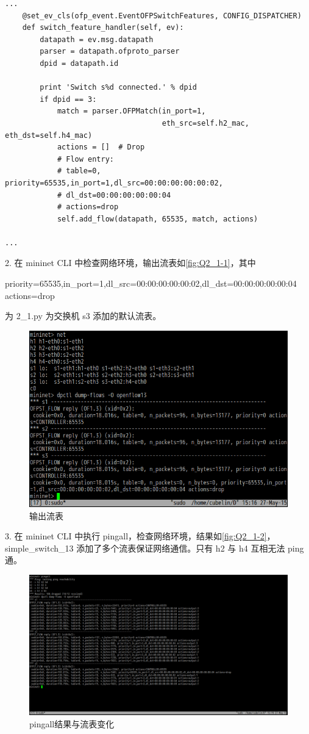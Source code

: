 \documentclass[format=draft,language=chinese,category=SDN]{hustreport}
\begin{document}
\begin{lstlisting}
...
    @set_ev_cls(ofp_event.EventOFPSwitchFeatures, CONFIG_DISPATCHER)
    def switch_feature_handler(self, ev):
        datapath = ev.msg.datapath
        parser = datapath.ofproto_parser
        dpid = datapath.id

        print 'Switch s%d connected.' % dpid
        if dpid == 3:
            match = parser.OFPMatch(in_port=1,
                                    eth_src=self.h2_mac, eth_dst=self.h4_mac)
            actions = []  # Drop
            # Flow entry:
            # table=0, priority=65535,in_port=1,dl_src=00:00:00:00:00:02,
            # dl_dst=00:00:00:00:00:04
            # actions=drop
            self.add_flow(datapath, 65535, match, actions)

...
\end{lstlisting}

2. 在 mininet CLI 中检查网络环境，输出流表如\autoref{fig:Q2_1-1}，其中
\begin{center}
priority=65535,in\_port=1,dl\_src=00:00:00:00:00:02,dl\_dst=00:00:00:00:00:04 actions=drop
\end{center}

为 2\_1.py 为交换机 s3 添加的默认流表。

\begin{figure}[!h]
\centering
\includegraphics[width=.618\textwidth]{fig/2_1-1.png}
\caption{输出流表}\label{fig:Q2_1-1}
\end{figure}

3. 在 mininet CLI 中执行 pingall，检查网络环境，结果如\autoref{fig:Q2_1-2}，simple\_switch\_13 添加了多个流表保证网络通信。只有 h2 与 h4 互相无法 ping 通。

\begin{figure}[!h]
\centering
\includegraphics[width=\textwidth]{fig/2_1-2.png}
\caption{pingall结果与流表变化}\label{fig:Q2_1-2}
\end{figure}
\end{document}
